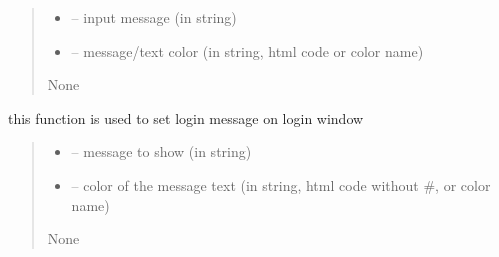 \documentclass[letterpaper,10pt,english]{sphinxmanual}
\begin{document}
\begin{savenotes}
\begin{fulllineitems}
\begin{savenotes}
\begin{fulllineitems}
\begin{quote}
\begin{description}
\begin{itemize}
\item {} 
\sphinxAtStartPar
{} – input message (in string)

\item {} 
\sphinxAtStartPar
{} – message/text color (in string, html code or color name)

\end{itemize}

\sphinxAtStartPar
None

\end{description}\end{quote}

\end{fulllineitems}\end{savenotes}


\begin{savenotes}\begin{fulllineitems}
\label{\detokenize{setting/setting_UI:oxin.setting_UI.UI_main_window.set_login_message}}
\pysigstartsignatures
{}
\pysigstopsignatures
\sphinxAtStartPar
this function is used to set login message on login window
\begin{quote}\begin{description}
\begin{itemize}
\item {} 
\sphinxAtStartPar
{} – message to show (in string)

\item {} 
\sphinxAtStartPar
{} – color of the message text (in string, html code without \#, or color name)

\end{itemize}

\sphinxAtStartPar
None

\end{description}\end{quote}

\end{fulllineitems}\end{savenotes}


\end{fulllineitems}
\end{savenotes}
\end{document}
